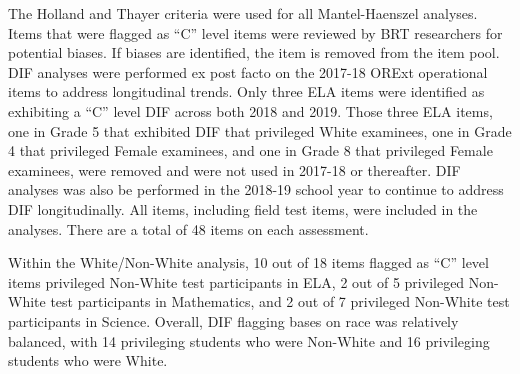 \documentclass[]{article}
\begin{document}
The Holland and Thayer criteria were used for all Mantel-Haenszel
analyses. Items that were flagged as ``C'' level items were reviewed by
BRT researchers for potential biases. If biases are identified, the item
is removed from the item pool. DIF analyses were performed ex post facto
on the 2017-18 ORExt operational items to address longitudinal trends.
Only three ELA items were identified as exhibiting a ``C'' level DIF
across both 2018 and 2019. Those three ELA items, one in Grade 5 that
exhibited DIF that privileged White examinees, one in Grade 4 that
privileged Female examinees, and one in Grade 8 that privileged Female
examinees, were removed and were not used in 2017-18 or thereafter. DIF
analyses was also be performed in the 2018-19 school year to continue to
address DIF longitudinally. All items, including field test items, were
included in the analyses. There are a total of 48 items on each
assessment.

Within the White/Non-White analysis, 10 out of 18 items flagged as ``C''
level items privileged Non-White test participants in ELA, 2 out of 5
privileged Non-White test participants in Mathematics, and 2 out of 7
privileged Non-White test participants in Science. Overall, DIF flagging
bases on race was relatively balanced, with 14 privileging students who
were Non-White and 16 privileging students who were White.
\end{document}
